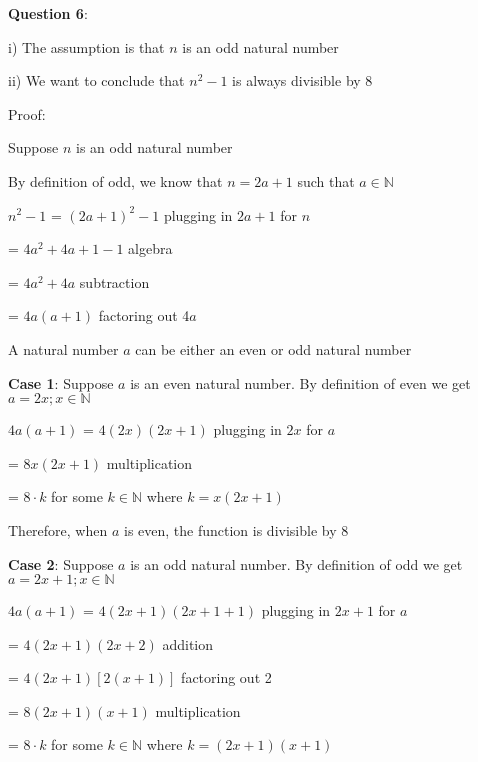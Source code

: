 \documentclass{article} %
\newcommand{\question}[2][]{\begin{flushleft}
        \textbf{Question #1}: \textit{#2}

\end{flushleft}}
\begin{document}
    \question[6]{}

    i) The assumption is that $n$ is an odd natural number

    ii) We want to conclude that $n^2 -1$ is always divisible by 8

    Proof:

    Suppose $n$ is an odd natural number
    
    By definition of odd, we know that $n = 2a+1$ such that $a \in \mathbb{N}$

    $n^2-1$ = $(2a+1)^2-1$ \tabto*{5cm}plugging in $2a + 1$ for $n$

    \tabto*{1.64cm} = $4a^2 + 4a + 1 -1$ \tabto*{5cm}algebra

    \tabto*{1.64cm} = $4a^2 + 4a$ \tabto*{5cm}subtraction

    \tabto*{1.64cm} = $4a(a + 1)$ \tabto*{5cm}factoring out 4$a$

    A natural number $a$ can be either an even or odd natural number 

    \vspace*{0.2cm}

    \textbf{Case 1}: Suppose $a$ is an even natural number. By definition of even we get $a = 2x; x \in \mathbb{N}$

    $4a(a + 1)$ = $4(2x)(2x + 1)$ \tabto*{5cm}plugging in $2x$ for $a$

    \tabto*{2.08cm} = $8x(2x + 1)$ \tabto*{5cm}multiplication

    \tabto*{2.08cm} = $8\cdot k$ for some $k \in \mathbb{N}$ where $k = x(2x + 1)$


    Therefore, when $a$ is even, the function is divisible by 8

    \vspace*{0.2cm}

    \textbf{Case 2}: Suppose $a$ is an odd natural number. By definition of odd we get $a = 2x + 1; x \in \mathbb{N}$

    $4a(a + 1)$ = $4(2x + 1)(2x + 1+ 1)$ \tabto*{6cm}plugging in $2x + 1$ for $a$

    \tabto*{2.08cm} = $4(2x + 1)(2x + 2)$ \tabto*{6cm}addition

    \tabto*{2.08cm} = $4(2x + 1)[2(x + 1)]$ \tabto*{6cm}factoring out 2

    \tabto*{2.08cm} = $8(2x + 1)(x + 1)$ \tabto*{6cm}multiplication

    \tabto*{2.08cm} = $8\cdot k$ for some $k \in \mathbb{N}$ where $k = (2x + 1)(x + 1)$
\end{document}
